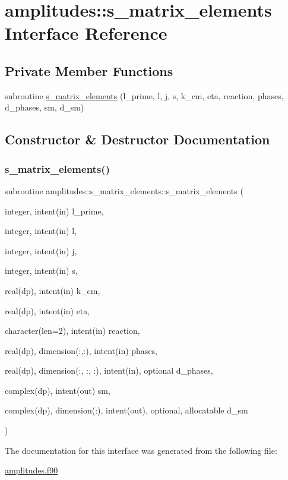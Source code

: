 \hypertarget{interfaceamplitudes_1_1s__matrix__elements}{}\section{amplitudes\+:\+:s\+\_\+matrix\+\_\+elements Interface Reference}
\label{interfaceamplitudes_1_1s__matrix__elements}
\subsection*{Private Member Functions}
\begin{DoxyCompactItemize}
\item 
subroutine \hyperlink{interfaceamplitudes_1_1s__matrix__elements_a47e0096555e9a9faa86dac7253c42f28}{s\+\_\+matrix\+\_\+elements} (l\+\_\+prime, l, j, s, k\+\_\+cm, eta, reaction, phases, d\+\_\+phases, sm, d\+\_\+sm)
\end{DoxyCompactItemize}


\subsection{Constructor \& Destructor Documentation}
\mbox{\label{interfaceamplitudes_1_1s__matrix__elements_a47e0096555e9a9faa86dac7253c42f28}} 
\subsubsection{\texorpdfstring{s\+\_\+matrix\+\_\+elements()}{s\_matrix\_elements()}}
{\footnotesize\ttfamily subroutine amplitudes\+::s\+\_\+matrix\+\_\+elements\+::s\+\_\+matrix\+\_\+elements (\begin{DoxyParamCaption}\item[{integer, intent(in)}]{l\+\_\+prime,  }\item[{integer, intent(in)}]{l,  }\item[{integer, intent(in)}]{j,  }\item[{integer, intent(in)}]{s,  }\item[{real(dp), intent(in)}]{k\+\_\+cm,  }\item[{real(dp), intent(in)}]{eta,  }\item[{character(len=2), intent(in)}]{reaction,  }\item[{real(dp), dimension(\+:,\+:), intent(in)}]{phases,  }\item[{real(dp), dimension(\+:, \+:, \+:), intent(in), optional}]{d\+\_\+phases,  }\item[{complex(dp), intent(out)}]{sm,  }\item[{complex(dp), dimension(\+:), intent(out), optional, allocatable}]{d\+\_\+sm }\end{DoxyParamCaption})\hspace{0.3cm}{\ttfamily [private]}}



The documentation for this interface was generated from the following file\+:\begin{DoxyCompactItemize}
\item 
\hyperlink{amplitudes_8f90}{amplitudes.\+f90}\end{DoxyCompactItemize}
